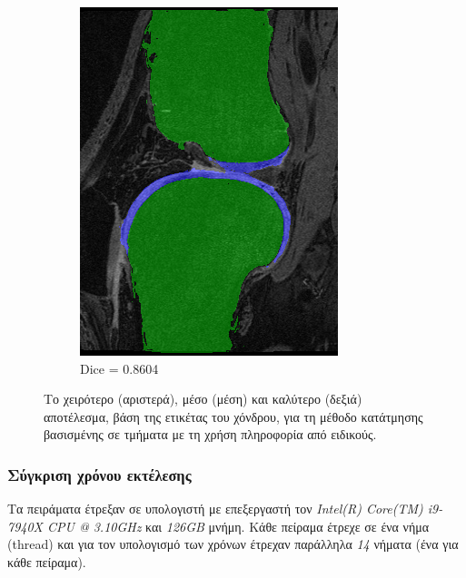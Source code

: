 \documentclass[a4paper,12pt]{article}
\begin{document}
\begin{figure}[H]
\begin{subfigure}[b]{0.32\linewidth}
    \includegraphics[width=\linewidth]{final_SPEP_best.png}
    \caption{Dice = 0.8604}
    \end{subfigure}

    \caption{Το χειρότερο (αριστερά), μέσο (μέση) και καλύτερο (δεξιά)
             αποτέλεσμα, βάση της ετικέτας του χόνδρου, για τη μέθοδο κατάτμησης
             βασισμένης σε τμήματα με τη χρήση πληροφορία από ειδικούς.}
    \label{fig:final_dice_SPEP}
\end{figure}

\subsubsection{Σύγκριση χρόνου εκτέλεσης}

Τα πειράματα έτρεξαν σε υπολογιστή με επεξεργαστή τον \emph{Intel(R) Core(TM)
i9-7940X CPU @ 3.10GHz} και \emph{126GB} μνήμη. Κάθε πείραμα έτρεχε σε ένα νήμα
(thread) και για τον υπολογισμό των χρόνων έτρεχαν παράλληλα \emph{14} νήματα
(ένα για κάθε πείραμα).
\end{document}

